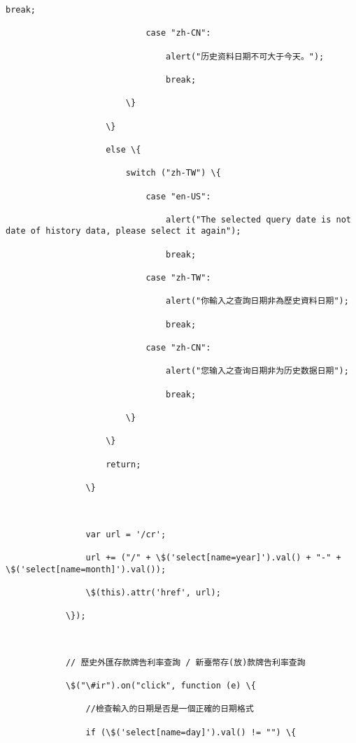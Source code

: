\documentclass[11pt]{article}
\begin{document}
\begin{Verbatim}[commandchars=\\\{\}]
                                break;

                            case "zh-CN":

                                alert("历史资料日期不可大于今天。");

                                break;

                        \}

                    \}

                    else \{

                        switch ("zh-TW") \{

                            case "en-US":

                                alert("The selected query date is not date of history data, please select it again");

                                break;

                            case "zh-TW":

                                alert("你輸入之查詢日期非為歷史資料日期");

                                break;

                            case "zh-CN":

                                alert("您输入之查询日期非为历史数据日期");

                                break;

                        \}

                    \}

                    return;

                \}



                var url = '/cr';

                url += ("/" + \$('select[name=year]').val() + "-" + \$('select[name=month]').val());

                \$(this).attr('href', url);

            \});



            // 歷史外匯存款牌告利率查詢 / 新臺幣存(放)款牌告利率查詢

            \$("\#ir").on("click", function (e) \{

                //檢查輸入的日期是否是一個正確的日期格式

                if (\$('select[name=day]').val() != "") \{


\end{Verbatim}
\end{document}
